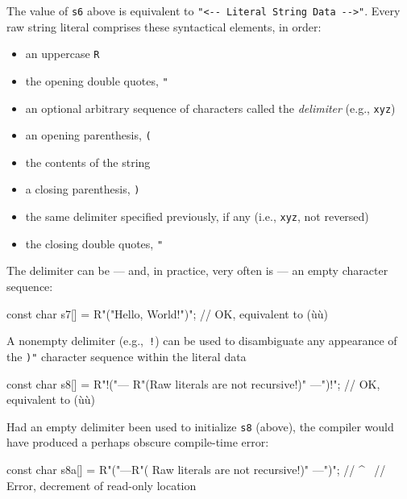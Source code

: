 The value of \lstinline!s6! above is equivalent to
\lstinline!"<--!~\lstinline!Literal!~\lstinline!String!~\lstinline!Data!~\lstinline!-->"!.
Every raw string literal comprises these syntactical elements, in order:
\begin{itemize}
\item{an uppercase \lstinline!R!}
\item{the opening double quotes, \lstinline!"!} 
\item{an optional arbitrary sequence of characters called the \emph{delimiter} (e.g., \lstinline!xyz!)}
\item{an opening parenthesis, \lstinline!(!}
\item{the contents of the string}
\item{a closing parenthesis, \lstinline!)!}
\item{the same delimiter specified previously, if any (i.e., \lstinline!xyz!, not reversed)} 
\item{the closing double quotes, \lstinline!"!}
\end{itemize}

The delimiter can be --- and, in practice, very often is --- an empty character
sequence:

\begin{emcppslisting}
const char s7[] = R"("Hello, World!")";
    // OK, equivalent to (ù{}ù)
\end{emcppslisting}
    
\noindent A nonempty delimiter (e.g.,~\lstinline|!|) can be used to disambiguate any
appearance of the \lstinline!)"! character sequence within the literal data

\begin{emcppslisting}
const char s8[] = R"!("--- R"(Raw literals are not recursive!)" ---")!";
    // OK, equivalent to (ù{}ù)
\end{emcppslisting}
    
\noindent Had an empty delimiter been used to initialize \lstinline!s8! (above), the
compiler would have produced a perhaps obscure compile-time error:

%
\begin{emcppslisting}[emcppserrorlines={1}]
const char s8a[] = R"("---R"( Raw literals are not recursive!)" ---")";         
    //                                                            ^~            
    // Error, decrement of read-only location
\end{emcppslisting}
    
